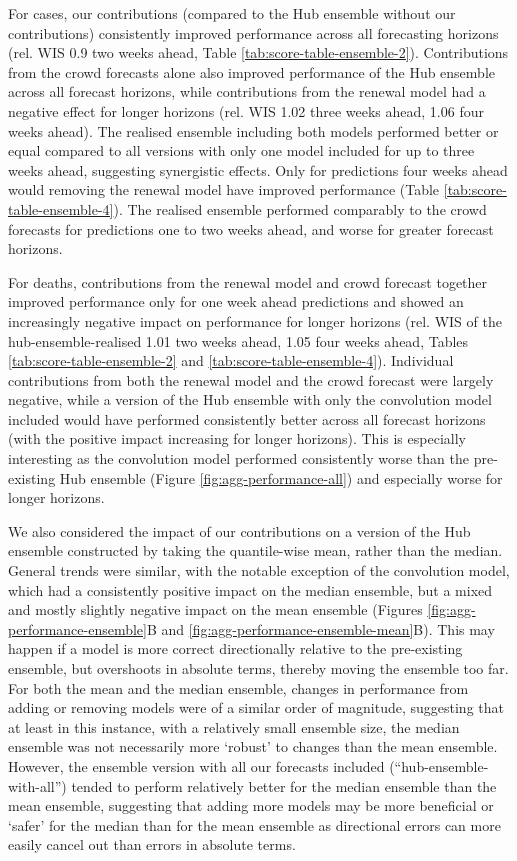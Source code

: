 \documentclass[
]{article}
\begin{document}
For cases, our contributions (compared to the Hub ensemble without our contributions) consistently improved performance across all forecasting horizons (rel. WIS 0.9 two weeks ahead, Table \ref{tab:score-table-ensemble-2}). Contributions from the crowd forecasts alone also improved performance of the Hub ensemble across all forecast horizons, while contributions from the renewal model had a negative effect for longer horizons (rel. WIS 1.02 three weeks ahead, 1.06 four weeks ahead). The realised ensemble including both models performed better or equal compared to all versions with only one model included for up to three weeks ahead, suggesting synergistic effects. Only for predictions four weeks ahead would removing the renewal model have improved performance (Table \ref{tab:score-table-ensemble-4}). The realised ensemble performed comparably to the crowd forecasts for predictions one to two weeks ahead, and worse for greater forecast horizons.

For deaths, contributions from the renewal model and crowd forecast together improved performance only for one week ahead predictions and showed an increasingly negative impact on performance for longer horizons (rel. WIS of the hub-ensemble-realised 1.01 two weeks ahead, 1.05 four weeks ahead, Tables \ref{tab:score-table-ensemble-2} and \ref{tab:score-table-ensemble-4}). Individual contributions from both the renewal model and the crowd forecast were largely negative, while a version of the Hub ensemble with only the convolution model included would have performed consistently better across all forecast horizons (with the positive impact increasing for longer horizons). This is especially interesting as the convolution model performed consistently worse than the pre-existing Hub ensemble (Figure \ref{fig:agg-performance-all}) and especially worse for longer horizons.

We also considered the impact of our contributions on a version of the Hub ensemble constructed by taking the quantile-wise mean, rather than the median.
General trends were similar, with the notable exception of the convolution model, which had a consistently positive impact on the median ensemble, but a mixed and mostly slightly negative impact on the mean ensemble (Figures \ref{fig:agg-performance-ensemble}B and \ref{fig:agg-performance-ensemble-mean}B). This may happen if a model is more correct directionally relative to the pre-existing ensemble, but overshoots in absolute terms, thereby moving the ensemble too far. For both the mean and the median ensemble, changes in performance from adding or removing models were of a similar order of magnitude, suggesting that at least in this instance, with a relatively small ensemble size, the median ensemble was not necessarily more `robust' to changes than the mean ensemble. However, the ensemble version with all our forecasts included (``hub-ensemble-with-all'') tended to perform relatively better for the median ensemble than the mean ensemble, suggesting that adding more models may be more beneficial or `safer' for the median than for the mean ensemble as directional errors can more easily cancel out than errors in absolute terms.
\end{document}

